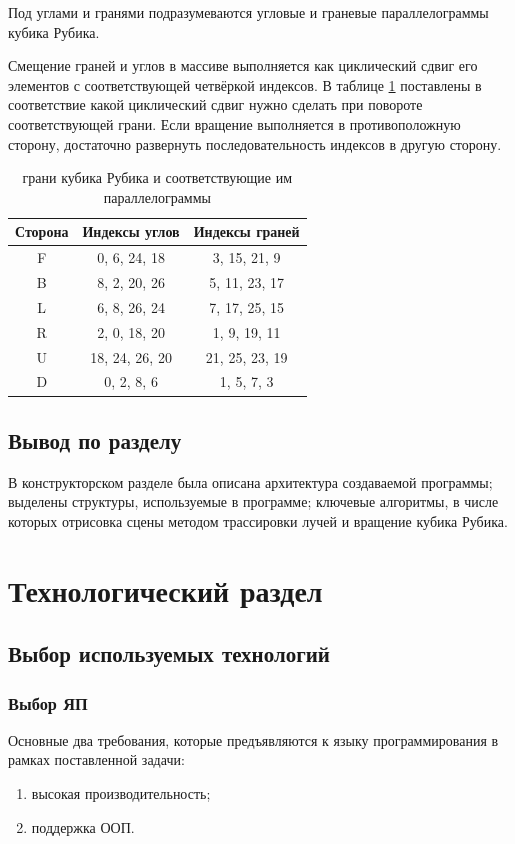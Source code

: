 \documentclass[a4paper, 14pt]{report} %
\begin{document}
	Под углами и гранями подразумеваются угловые и граневые параллелограммы кубика Рубика.
	
	Смещение граней и углов в массиве выполняется как циклический сдвиг его элементов с соответствующей четвёркой индексов. В таблице \ref{tabular:cube_indexes} поставлены в соответствие какой циклический сдвиг нужно сделать при повороте соответствующей грани. Если вращение выполняется в противоположную сторону, достаточно развернуть последовательность индексов в другую сторону.
	
	\begin{table}[ht]
		\centering
		\caption{грани кубика Рубика и соответствующие им параллелограммы}
		\label{tabular:cube_indexes}
		\begin{tabular}{|c|c|c|}
			\hline
			Сторона & Индексы углов & Индексы граней \\
			\hline
			\hline
			F & 0, 6, 24, 18	& 3, 15, 21, 9		\\ \hline
			B & 8, 2, 20, 26	& 5, 11, 23, 17		\\ \hline
			L & 6, 8, 26, 24	& 7, 17, 25, 15		\\ \hline
			R & 2, 0, 18, 20	& 1, 9, 19, 11		\\ \hline
			U & 18, 24, 26, 20	& 21, 25, 23, 19	\\ \hline
			D & 0, 2, 8, 6		& 1, 5, 7, 3		\\ \hline
		\end{tabular}
	\end{table}
	
	\section{Вывод по разделу}
	В конструкторском разделе была описана архитектура создаваемой программы; выделены структуры, используемые в программе; ключевые алгоритмы, в числе которых отрисовка сцены методом трассировки лучей и вращение кубика Рубика. 
	
	\chapter{Технологический раздел}
	\section{Выбор используемых технологий}
	\subsection{Выбор ЯП}
	Основные два требования, которые предъявляются к языку программирования в рамках поставленной задачи:
	\begin{enumerate}
		\item высокая производительность;
		\item поддержка ООП.
	\end{enumerate}
\end{document}
